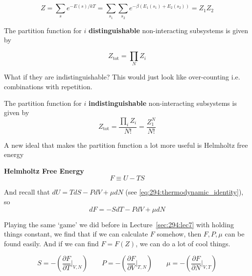 \documentclass[10pt]{article}
\begin{document}
\begin{equation}
	Z = \sum_s e^{-E(s) /kT} = \sum_{s_1} \sum_{s_2} e^{ -\beta(E_1(s_1) + E_2(s_2))} = Z_1 Z_2
\end{equation}

\begin{theorem}
	The partition function for $ i $ \textbf{distinguishable} non-interacting subsystems is given by

	\begin{equation}
		Z_\text{tot}  = \prod_N Z_i
		\label{eq:294:partition_fn_tot}
	\end{equation}
\end{theorem}

What if they are indistinguishable?
This would just look like over-counting i.e. combinations with repetition.


\begin{theorem}
	The partition function for $ i $ \textbf{indistinguishable} non-interacting subsystems is given by
	\begin{equation}
		Z_\text{tot}  = \frac{\prod_i Z_i}{N!} = \frac{Z_1^N}{N!}
		\label{eq:294:partition_fn_tot_indistinguishable}
	\end{equation}
\end{theorem}


A new ideal that makes the partition function a lot more useful is Helmholtz free energy


\begin{definition}
	\textbf{Helmholtz Free Energy} 
	\begin{equation}
		F \equiv U-TS
	\end{equation}

	And recall that $ dU = TdS - PdV + \mu dN $  (see \ref{eq:294:thermodynamic_identity}), so 
	\begin{equation}
		dF = -SdT -PdV + \mu dN
	\end{equation}
\end{definition}

Playing the same `game' we did before in Lecture~\ref{sec:294:lec7} with holding things constant, we find that if we can calculate $ F $ somehow, then $F, P, \mu$ can be found easily. 
And if we can find $ F=F(Z) $, we can do a lot of cool things.

\begin{equation}
	S = -(\frac{\partial F}{\partial T} |_{V, N})\qquad
	P = -(\frac{\partial F}{\partial V} |_{T, N})\qquad
	\mu = -(\frac{\partial F}{\partial N} |_{V, T})
\end{equation}
\end{document}
